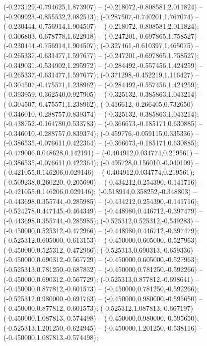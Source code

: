  (-0.273129,-0.794625,1.873907) -- (-0.218072,-0.808581,2.011824) -- (-0.209923,-0.855532,2.082513);
 (-0.287507,-0.740201,1.767074) -- (-0.230444,-0.756914,1.904507) -- (-0.218072,-0.808581,2.011824);
 (-0.306803,-0.678778,1.622918) -- (-0.247201,-0.697865,1.758527) -- (-0.230444,-0.756914,1.904507);
 (-0.327461,-0.610397,1.465075) -- (-0.265337,-0.631477,1.597677) -- (-0.247201,-0.697865,1.758527);
 (-0.349031,-0.534902,1.295972) -- (-0.284492,-0.557456,1.424259) -- (-0.265337,-0.631477,1.597677);
 (-0.371298,-0.452219,1.116427) -- (-0.304507,-0.475571,1.238962) -- (-0.284492,-0.557456,1.424259);
 (-0.393959,-0.362540,0.927905) -- (-0.325132,-0.385863,1.043214) -- (-0.304507,-0.475571,1.238962);
 (-0.416612,-0.266405,0.732650) -- (-0.346010,-0.288757,0.839374) -- (-0.325132,-0.385863,1.043214);
 (-0.438752,-0.164780,0.533783) -- (-0.366673,-0.185171,0.630885) -- (-0.346010,-0.288757,0.839374);
 (-0.459776,-0.059115,0.335336) -- (-0.386535,-0.076611,0.422364) -- (-0.366673,-0.185171,0.630885);
 (-0.479006,0.048628,0.142191) -- (-0.404912,0.034774,0.219561) -- (-0.386535,-0.076611,0.422364);
 (-0.495728,0.156010,-0.040109) -- (-0.421055,0.146206,0.029146) -- (-0.404912,0.034774,0.219561);
 (-0.509238,0.260220,-0.205690) -- (-0.434212,0.254390,-0.141716) -- (-0.421055,0.146206,0.029146);
 (-0.518914,0.358252,-0.348803) -- (-0.443698,0.355744,-0.285985) -- (-0.434212,0.254390,-0.141716);
 (-0.524278,0.447145,-0.464349) -- (-0.448980,0.446712,-0.397479) -- (-0.443698,0.355744,-0.285985);
 (-0.525312,0.525312,-0.549283) -- (-0.450000,0.525312,-0.472966) -- (-0.448980,0.446712,-0.397479);
 (-0.525312,0.605000,-0.613153) -- (-0.450000,0.605000,-0.527963) -- (-0.450000,0.525312,-0.472966);
 (-0.525313,0.690313,-0.659336) -- (-0.450000,0.690312,-0.567729) -- (-0.450000,0.605000,-0.527963);
 (-0.525313,0.781250,-0.687832) -- (-0.450000,0.781250,-0.592266) -- (-0.450000,0.690312,-0.567729);
 (-0.525313,0.877812,-0.698641) -- (-0.450000,0.877812,-0.601573) -- (-0.450000,0.781250,-0.592266);
 (-0.525312,0.980000,-0.691763) -- (-0.450000,0.980000,-0.595650) -- (-0.450000,0.877812,-0.601573);
 (-0.525312,1.087813,-0.667197) -- (-0.450000,1.087813,-0.574498) -- (-0.450000,0.980000,-0.595650);
 (-0.525313,1.201250,-0.624945) -- (-0.450000,1.201250,-0.538116) -- (-0.450000,1.087813,-0.574498);
